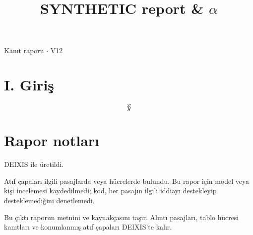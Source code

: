 \documentclass[journal]{IEEEtran}
\begin{document}
\renewcommand{\abstractname}{Özet}
\renewcommand{\IEEEkeywordsname}{Dizin Terimleri}
\renewcommand{\refname}{Kaynaklar}

\title{SYNTHETIC report \& \ensuremath{\alpha}}

\maketitle

\noindent Kanıt raporu \ensuremath{\cdot} V12

\section*{I. Giriş}

\begin{equation}
\label{eq:EQ1}
x
\end{equation}
\cite{Synth26}
\begin{equation*}
y
\end{equation*}
\cite{Synth26}

\section*{Rapor notları}

DEIXIS ile üretildi.

Atıf çapaları ilgili pasajlarda veya hücrelerde bulundu. Bu rapor için model veya kişi incelemesi kaydedilmedi; kod, her pasajın ilgili iddiayı destekleyip desteklemediğini denetlemedi.

Bu çıktı raporun metnini ve kaynakçasını taşır. Alıntı pasajları, tablo hücresi kanıtları ve konumlanmış atıf çapaları DEIXIS'te kalır.




\end{document}
